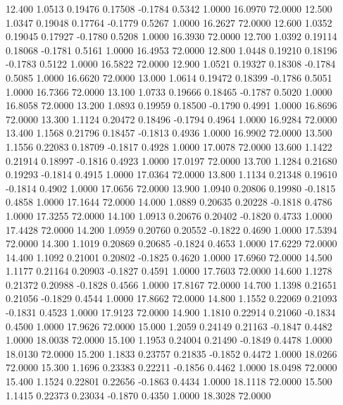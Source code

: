   12.400   1.0513   0.19476   0.17508  -0.1784   0.5342   1.0000  16.0970  72.0000
  12.500   1.0347   0.19048   0.17764  -0.1779   0.5267   1.0000  16.2627  72.0000
  12.600   1.0352   0.19045   0.17927  -0.1780   0.5208   1.0000  16.3930  72.0000
  12.700   1.0392   0.19114   0.18068  -0.1781   0.5161   1.0000  16.4953  72.0000
  12.800   1.0448   0.19210   0.18196  -0.1783   0.5122   1.0000  16.5822  72.0000
  12.900   1.0521   0.19327   0.18308  -0.1784   0.5085   1.0000  16.6620  72.0000
  13.000   1.0614   0.19472   0.18399  -0.1786   0.5051   1.0000  16.7366  72.0000
  13.100   1.0733   0.19666   0.18465  -0.1787   0.5020   1.0000  16.8058  72.0000
  13.200   1.0893   0.19959   0.18500  -0.1790   0.4991   1.0000  16.8696  72.0000
  13.300   1.1124   0.20472   0.18496  -0.1794   0.4964   1.0000  16.9284  72.0000
  13.400   1.1568   0.21796   0.18457  -0.1813   0.4936   1.0000  16.9902  72.0000
  13.500   1.1556   0.22083   0.18709  -0.1817   0.4928   1.0000  17.0078  72.0000
  13.600   1.1422   0.21914   0.18997  -0.1816   0.4923   1.0000  17.0197  72.0000
  13.700   1.1284   0.21680   0.19293  -0.1814   0.4915   1.0000  17.0364  72.0000
  13.800   1.1134   0.21348   0.19610  -0.1814   0.4902   1.0000  17.0656  72.0000
  13.900   1.0940   0.20806   0.19980  -0.1815   0.4858   1.0000  17.1644  72.0000
  14.000   1.0889   0.20635   0.20228  -0.1818   0.4786   1.0000  17.3255  72.0000
  14.100   1.0913   0.20676   0.20402  -0.1820   0.4733   1.0000  17.4428  72.0000
  14.200   1.0959   0.20760   0.20552  -0.1822   0.4690   1.0000  17.5394  72.0000
  14.300   1.1019   0.20869   0.20685  -0.1824   0.4653   1.0000  17.6229  72.0000
  14.400   1.1092   0.21001   0.20802  -0.1825   0.4620   1.0000  17.6960  72.0000
  14.500   1.1177   0.21164   0.20903  -0.1827   0.4591   1.0000  17.7603  72.0000
  14.600   1.1278   0.21372   0.20988  -0.1828   0.4566   1.0000  17.8167  72.0000
  14.700   1.1398   0.21651   0.21056  -0.1829   0.4544   1.0000  17.8662  72.0000
  14.800   1.1552   0.22069   0.21093  -0.1831   0.4523   1.0000  17.9123  72.0000
  14.900   1.1810   0.22914   0.21060  -0.1834   0.4500   1.0000  17.9626  72.0000
  15.000   1.2059   0.24149   0.21163  -0.1847   0.4482   1.0000  18.0038  72.0000
  15.100   1.1953   0.24004   0.21490  -0.1849   0.4478   1.0000  18.0130  72.0000
  15.200   1.1833   0.23757   0.21835  -0.1852   0.4472   1.0000  18.0266  72.0000
  15.300   1.1696   0.23383   0.22211  -0.1856   0.4462   1.0000  18.0498  72.0000
  15.400   1.1524   0.22801   0.22656  -0.1863   0.4434   1.0000  18.1118  72.0000
  15.500   1.1415   0.22373   0.23034  -0.1870   0.4350   1.0000  18.3028  72.0000
